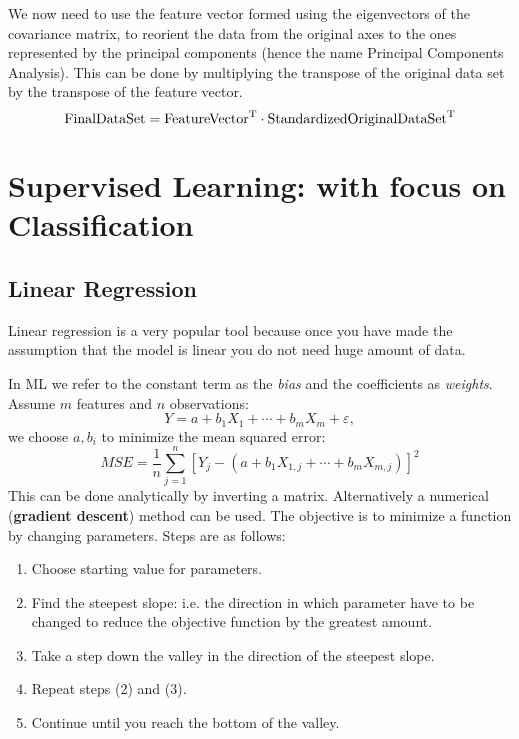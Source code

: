 We now need to use the feature vector formed using the eigenvectors of the covariance matrix, to reorient the data from the original axes to the ones represented by the principal components (hence the name Principal Components Analysis). This can be done by multiplying the transpose of the original data set by the transpose of the feature vector.
\begin{equation*}
    \text{FinalDataSet} =\text{FeatureVector}^{\mathrm{T}} \cdot \text{StandardizedOriginalDataSet}^{\mathrm{T}}
\end{equation*}

\section{Supervised Learning: with focus on Classification}

\subsection{Linear Regression}

Linear regression is a very popular tool because once you have made the assumption that the model is linear you do not need huge amount of data.

In ML we refer to the constant term as the \textit{bias} and the coefficients as \textit{weights}. Assume $m$ features and $n$ observations:
\begin{equation*}
    Y=a+b_{1} X_{1} +\cdots +b_{m} X_{m} +\varepsilon,
\end{equation*}
we choose $a,b_{i}$ to minimize the mean squared error:
\begin{equation*}
    MSE=\frac{1}{n}\sum _{j=1}^{n}[ Y_{j} -(a+b_{1} X_{1,j} +\cdots +b_{m} X_{m,j})]^{2}
\end{equation*}
This can be done analytically by inverting a matrix. Alternatively a numerical (\textbf{gradient descent}) method can be used. The objective is to minimize a function by changing parameters. Steps are as follows:
\begin{enumerate}
    \item Choose starting value for parameters.
    \item Find the steepest slope: i.e. the direction in which parameter have to be changed to reduce the objective function by the greatest amount.
    \item Take a step down the valley in the direction of the steepest slope.
    \item Repeat steps (2) and (3).
    \item Continue until you reach the bottom of the valley.
\end{enumerate}

